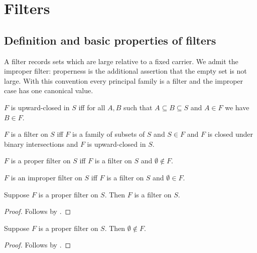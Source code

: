


\section{Filters}

\subsection{Definition and basic properties of filters}

A filter records sets which are large relative to a fixed carrier.  We admit
the improper filter: properness is the additional assertion that the empty set
is not large.  With this convention every principal family is a filter and the
improper case has one canonical value.

\begin{abbreviation}\label{upwardclosed}
    $F$ is upward-closed in $S$ iff
    for all $A, B$ such that $A\subseteq B\subseteq S$ and $A\in F$ we have $B\in F$.
\end{abbreviation}

\begin{definition}\label{filter}
    $F$ is a filter on $S$ iff
    $F$ is a family of subsets of $S$
    and $S\in F$
    and $F$ is closed under binary intersections
    and $F$ is upward-closed in $S$.
\end{definition}

\begin{definition}\label{proper_filter}
    $F$ is a proper filter on $S$ iff
        $F$ is a filter on $S$ and $\emptyset\notin F$.
\end{definition}

\begin{definition}\label{improper_filter}
    $F$ is an improper filter on $S$ iff
        $F$ is a filter on $S$ and $\emptyset\in F$.
\end{definition}

\begin{classification}\label{proper_filter_is_filter}
    Suppose $F$ is a proper filter on $S$.
    Then $F$ is a filter on $S$.
\end{classification}
\begin{proof}
    Follows by .
\end{proof}

\begin{proposition}\label{proper_filter_excludes_emptyset}
    Suppose $F$ is a proper filter on $S$.
    Then $\emptyset\notin F$.
\end{proposition}
\begin{proof}
    Follows by .
\end{proof}

